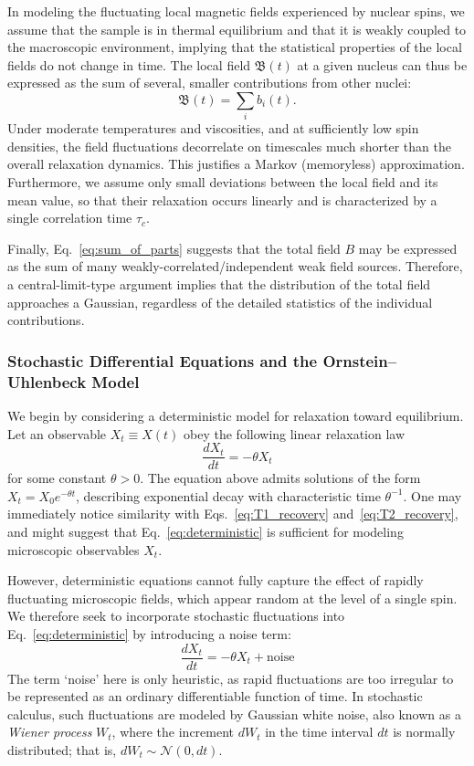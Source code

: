 \documentclass[%
 reprint,
 amsmath,amssymb,
 aps,
]{revtex4-2}
\begin{document}
In modeling the fluctuating local magnetic fields experienced by nuclear spins, we assume that the sample is in thermal equilibrium and that it is weakly coupled to the macroscopic environment, implying that the statistical properties of the local fields do not change in time. The local field $\mathfrak{B} (t)$ at a given nucleus can thus be expressed as the sum of several, smaller contributions from other nuclei:
\begin{equation}
    \mathfrak{B}(t) = \sum_i b_i (t).
    \label{eq:sum_of_parts}
\end{equation}
Under moderate temperatures and viscosities, and at sufficiently low spin densities, the field fluctuations decorrelate on timescales much shorter than the overall relaxation dynamics. This justifies a Markov (memoryless) approximation. Furthermore, we assume only small deviations between the local field and its mean value, so that their relaxation occurs linearly and is characterized by a single correlation time $\tau_c$.

Finally, Eq.~\ref{eq:sum_of_parts} suggests that the total field $B$ may be expressed as the sum of many weakly-correlated/independent weak field sources. Therefore, a central-limit-type argument implies that the distribution of the total field approaches a Gaussian, regardless of the detailed statistics of the individual contributions.

\subsubsection{Stochastic Differential Equations and the Ornstein–Uhlenbeck Model}
\label{sec:SDEtoOU}
We begin by considering a deterministic model for relaxation toward equilibrium. Let an observable $X_t \equiv X(t)$ obey the following linear relaxation law
\begin{equation}
    \frac{dX_t}{dt} = -\theta X_t
    \label{eq:deterministic}
\end{equation}
for some constant $\theta>0$. The equation above admits solutions of the form $X_t = X_0 e^{-\theta t}$, describing exponential decay with characteristic time $\theta^{-1}$. One may immediately notice similarity with Eqs.~\ref{eq:T1_recovery} and~\ref{eq:T2_recovery}, and might suggest that Eq.~\ref{eq:deterministic} is sufficient for modeling microscopic observables $X_t$.

However, deterministic equations cannot fully capture the effect of rapidly fluctuating microscopic fields, which appear random at the level of a single spin. We therefore seek to incorporate stochastic fluctuations into Eq.~\ref{eq:deterministic} by introducing a noise term:
\begin{equation*}
    \frac{dX_t}{dt} = -\theta X_t + \mathrm{noise}
\end{equation*}
The term `noise' here is only heuristic, as rapid fluctuations are too irregular to be represented as an ordinary differentiable function of time. In stochastic calculus, such fluctuations are modeled by Gaussian white noise, also known as a \textit{Wiener process} $W_t$, where the increment $dW_t$ in the time interval $dt$ is normally distributed; that is, $dW_t\sim\mathcal{N}(0,dt)$.
\end{document}
